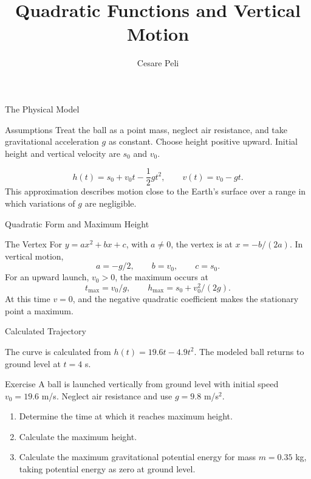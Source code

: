 \documentclass[10pt]{beamer}
\title{Quadratic Functions and Vertical Motion}
\author{Cesare Peli}
\date{}
\begin{document}
\frame{\titlepage}
\begin{frame}{The Physical Model}
\begin{block}{Assumptions}
Treat the ball as a point mass, neglect air resistance, and take gravitational acceleration \(g\) as constant. Choose height positive upward. Initial height and vertical velocity are \(s_0\) and \(v_0\).
\end{block}
\[
h(t)=s_0+v_0t-\frac12gt^2,
\qquad v(t)=v_0-gt.
\]
This approximation describes motion close to the Earth's surface over a range in which variations of \(g\) are negligible.
\end{frame}
\begin{frame}{Quadratic Form and Maximum Height}
\begin{block}{The Vertex}
For \(y=ax^2+bx+c\), with \(a\ne0\), the vertex is at \(x=-b/(2a)\). In vertical motion,
\[
a=-g/2,\qquad b=v_0,\qquad c=s_0.
\]
For an upward launch, \(v_0>0\), the maximum occurs at
\[
t_{\max}=v_0/g,\qquad h_{\max}=s_0+v_0^2/(2g).
\]
At this time \(v=0\), and the negative quadratic coefficient makes the stationary point a maximum.
\end{block}
\end{frame}
\begin{frame}{Calculated Trajectory}
\begin{center}
\end{center}
\small The curve is calculated from \(h(t)=19.6t-4.9t^2\). The modeled ball returns to ground level at \(t=4\) s.
\end{frame}
\begin{frame}{Exercise}
A ball is launched vertically from ground level with initial speed \(v_0=19.6\) m/s. Neglect air resistance and use \(g=9.8\) m/s\(^2\).
\begin{enumerate}
\item Determine the time at which it reaches maximum height.
\item Calculate the maximum height.
\item Calculate the maximum gravitational potential energy for mass \(m=0.35\) kg, taking potential energy as zero at ground level.
\end{enumerate}
\end{frame}
\end{document}
